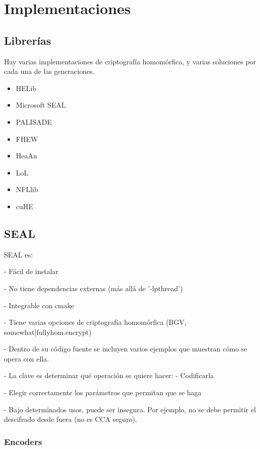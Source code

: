\chapter{Implementaciones}
\label{chap:libs}

\section{Librerías}

Hay varias implementaciones de criptografía homomórfica, y varias soluciones por cada una de las generaciones.

\begin{itemize}
    \item HELib
    \item Microsoft SEAL
    \item PALISADE
    \item FHEW
    \item HeaAn
    \item LoL
    \item NFLlib
    \item cuHE
\end{itemize}{}

\section{SEAL}

SEAL es:

- Fácil de instalar

- No tiene dependencias externas (más allá de '-lpthread')

- Integrable con cmake

- Tiene varias opciones de criptografía homomórfica (BGV, {somewhat|fully}hom.encrypt)

- Dentro de su código fuente se incluyen varios ejemplos que muestran cómo se opera con ella.

- La clave es determinar qué operación se quiere hacer:
    - Codificarla

    - Elegir correctamente los parámetros que permitan que se haga
    
- Bajo determinados usos, puede ser insegura. Por ejemplo, no se debe permitir el descifrado desde fuera \cite{peng_danger_2019} (no es CCA seguro).

\subsection{Encoders}

